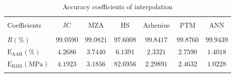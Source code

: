 \documentclass[twoside,english,1p,final,sort&compress]{elsarticle}
\theoremstyle{plain}
\newcommand{\RMSE}{\text{E}_\text{RMS}}
\newcommand{\AARE}{\text{E}_\text{AAR}}
\begin{document}
\begin{table}[h!]
\centering{}
\caption{Accuracy coefficients of interpolation}
\begin{tabular}{lcccccc}
\hline
&		&		&         &             &		   &	\\
Coefficients&JC  & MZA  &HS  & Arhenius      & PTM  &ANN \\
&				&				&         &             &	&\\
\hline
$R(\%)$&$99.0590$&$99.0821$&$97.6008$&$99.8417$& $99.8760$&$99.9439$  \\
$\AARE(\%)$&$4.2686$&$3.7440$&$6.1391$&$2.3321$&$2.7590$&$1.4018$   \\
$\RMSE(\text{MPa})$&$4.1923$&$3.1856$&$82.6956$&$2.29891$&$2.4632$&$1.0228$ \\
\hline
\label{tab:IntVal}
\end{tabular}
\end{table}
\end{document}
